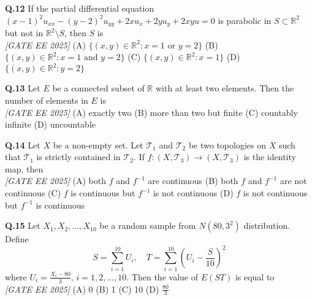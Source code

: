 \documentclass[11pt]{article}
\begin{document}
\begin{flushleft}
\textbf{Q.12} If the partial differential equation $(x - 1)^2 u_{xx} - (y - 2)^2 u_{yy} + 2xu_x + 2yu_y + 2xyu = 0$ is parabolic in $S \subset \mathbb{R}^2$ but not in $\mathbb{R}^2 \setminus S$, then $S$ is
\\[1ex] \textit{[GATE EE 2025]}
\newline
(A) $\{(x, y) \in \mathbb{R}^2 : x = 1 \text{ or } y = 2 \}$ \hspace{0.5cm} 
(B) $\{(x, y) \in \mathbb{R}^2 : x = 1 \text{ and } y = 2 \}$ \newline
(C) $\{(x, y) \in \mathbb{R}^2 : x = 1 \}$ \hspace{1.5cm} 
(D) $\{(x, y) \in \mathbb{R}^2 : y = 2 \}$
\newline
\newline

\textbf{Q.13} Let $E$ be a connected subset of $\mathbb{R}$ with at least two elements. Then the number of elements in $E$ is
\\[1ex] \textit{[GATE EE 2025]}
\newline
(A) exactly two \hspace{1cm} (B) more than two but finite \hspace{1cm} (C) countably infinite \hspace{1cm} (D) uncountable
\newline
\newline

\textbf{Q.14} Let $X$ be a non-empty set. Let $\mathcal{T}_1$ and $\mathcal{T}_2$ be two topologies on $X$ such that $\mathcal{T}_1$ is strictly contained in $\mathcal{T}_2$. If $f : (X, \mathcal{T}_3) \rightarrow (X, \mathcal{T}_3)$ is the identity map, then
\\[1ex] \textit{[GATE EE 2025]}
\newline
(A) both $f$ and $f^{-1}$ are continuous \hspace{1cm}
(B) both $f$ and $f^{-1}$ are not continuous \newline
(C) $f$ is continuous but $f^{-1}$ is not continuous \hspace{0.5cm}
(D) $f$ is not continuous but $f^{-1}$ is continuous
\newline
\newline

\textbf{Q.15} Let $X_1, X_2, \dots, X_{10}$ be a random sample from $N(80, 3^2)$ distribution. Define
\[
S = \sum_{i=1}^{10} U_i, \quad T = \sum_{i=1}^{10} \left(U_i - \frac{S}{10} \right)^2
\]
where $U_i = \frac{X_i - 80}{3}, \, i = 1, 2, \dots, 10$. Then the value of $E(ST)$ is equal to
\\[1ex] \textit{[GATE EE 2025]}
\newline
(A) 0 \hspace{1cm} (B) 1 \hspace{1cm} (C) 10 \hspace{1cm} (D) $\frac{80}{3}$
\newline
\end{flushleft}
\end{document}

